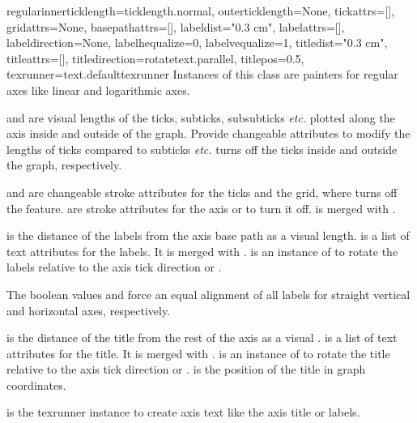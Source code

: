 \begin{classdesc}{regular}{innerticklength=ticklength.normal,
                           outerticklength=None,
                           tickattrs=[],
                           gridattrs=None,
                           basepathattrs=[],
                           labeldist="0.3 cm",
                           labelattrs=[],
                           labeldirection=None,
                           labelhequalize=0,
                           labelvequalize=1,
                           titledist="0.3 cm",
                           titleattrs=[],
                           titledirection=rotatetext.parallel,
                           titlepos=0.5,
                           texrunner=text.defaulttexrunner}
  Instances of this class are painters for regular axes like linear
  and logarithmic axes.

   and  are visual \PyX{}
  lengths of the ticks, subticks, subsubticks \emph{etc.} plotted
  along the axis inside and outside of the graph. Provide changeable
  attributes to modify the lengths of ticks compared to subticks
  \emph{etc.}  turns off the ticks inside and outside the
  graph, respectively.

   and  are changeable stroke attributes
  for the ticks and the grid, where  turns off the feature.
   are stroke attributes for the axis or
   to turn it off.  is merged with
  .

   is the distance of the labels from the axis base path
  as a visual \PyX{} length.  is a list of text
  attributes for the labels. It is merged with
  .
   is an instance of  to rotate
  the labels relative to the axis tick direction or .

  The boolean values  and 
  force an equal alignment of all labels for straight vertical and
  horizontal axes, respectively.

   is the distance of the title from the rest of the
  axis as a visual \PyX{}.  is a list of text
  attributes for the title. It is merged with
  .
   is an instance of  to rotate
  the title relative to the axis tick direction or .
   is the position of the title in graph coordinates.

   is the texrunner instance to create axis text like
  the axis title or labels.
\end{classdesc}

